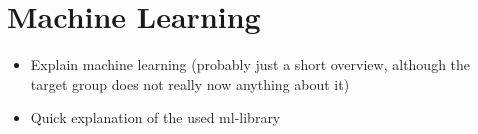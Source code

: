 \section{Machine Learning}
\begin{itemize}
  \item Explain machine learning (probably just a short overview, although the target group does not really now anything about it)
  \item Quick explanation of the used ml-library
\end{itemize}